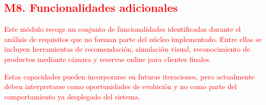 \subsection{\textcolor{red}{M8. Funcionalidades adicionales}}

\textcolor{red}{Este módulo recoge un conjunto de funcionalidades identificadas durante el análisis de requisitos que no forman parte del núcleo implementado. Entre ellas se incluyen herramientas de recomendación, simulación visual, reconocimiento de productos mediante cámara y reservas online para clientes finales.}

\textcolor{red}{Estas capacidades pueden incorporarse en futuras iteraciones, pero actualmente deben interpretarse como oportunidades de evolución y no como parte del comportamiento ya desplegado del sistema.}

